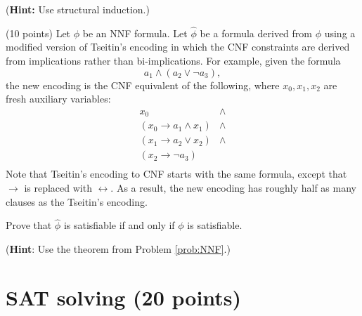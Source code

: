 \documentclass{handout}
\begin{document}
\begin{questions}
(\textbf{Hint:} Use structural induction.) \label{prob:NNF}



\item (10 points) Let $\phi$ be an NNF formula.  Let $\hat{\phi}$ be a formula derived from $\phi$ using a modified version of Tseitin's encoding in which the CNF constraints are derived from implications rather than bi-implications.   For example, given the formula
\[a_1\land (a_2 \lor \neg a_3),\]
the new encoding is the CNF equivalent of the following, where $x_0, x_1, x_2$ are fresh auxiliary variables:
\[
\begin{array}{ll}
x_0 & \land \\
(x_0 \rightarrow a_1 \land x_1) & \land \\
(x_1 \rightarrow a_2 \lor x_2) & \land \\
(x_2 \rightarrow \neg a_3) &  \\
\end{array}
\]
Note that Tseitin's encoding to CNF starts with the same formula, except that $\rightarrow$ is replaced with $\leftrightarrow$.  As a result, the new encoding has roughly half as many clauses as the Tseitin's encoding.

\medskip
Prove that $\hat{\phi}$ is satisfiable if and only if $\phi$ is satisfiable.

\medskip
(\textbf{Hint}: Use the theorem from Problem \ref{prob:NNF}.)



\end{questions}

\pagebreak

\section{SAT solving (20 points)}\label{solving}
\end{document}
